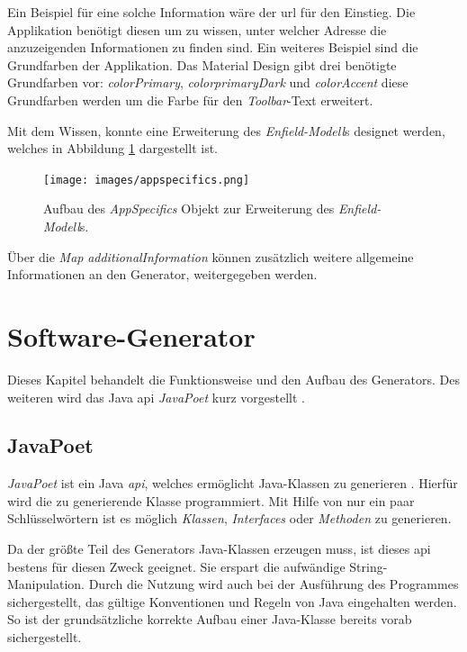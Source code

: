 Ein Beispiel für eine solche Information wäre der \acf{url} für den Einstieg. Die Applikation benötigt diesen um zu wissen, unter welcher Adresse die anzuzeigenden Informationen zu finden sind. Ein weiteres Beispiel sind die Grundfarben der Applikation. Das Material Design gibt drei benötigte Grundfarben vor: \textit{colorPrimary}, \textit{colorprimaryDark} und \textit{colorAccent} diese Grundfarben werden um die Farbe für den \textit{Toolbar}-Text erweitert.

Mit dem Wissen, konnte eine Erweiterung des \textit{Enfield-Modell}s designet werden, welches in Abbildung \ref{fig:appspecifics} dargestellt ist.

\begin{figure}[H]
	\begin{center}
		\texttt{[image: images/appspecifics.png]}
		\caption{Aufbau des \textit{AppSpecifics} Objekt  zur Erweiterung des \textit{Enfield-Modell}s.}
		\label{fig:appspecifics}
	\end{center}
\end{figure}

 Über die \textit{Map} \textit{additionalInformation} können zusätzlich weitere allgemeine Informationen an den Generator, weitergegeben werden.

\section{Software-Generator}

Dieses Kapitel behandelt die Funktionsweise und den Aufbau des Generators. Des weiteren wird das Java \acf{api} \textit{JavaPoet} kurz vorgestellt \cite{poet}.

\subsection{JavaPoet}
\textit{JavaPoet} ist ein Java \textit{\ac{api}}, welches ermöglicht Java-Klassen zu generieren \cite{poet}. Hierfür wird die zu generierende Klasse programmiert. Mit Hilfe von nur ein paar Schlüsselwörtern ist es möglich \textit{Klassen}, \textit{Interfaces} oder \textit{Methoden} zu generieren. 

Da der größte Teil des Generators Java-Klassen erzeugen muss, ist dieses \ac{api} bestens für diesen Zweck geeignet. Sie erspart die aufwändige String-Manipulation. Durch die Nutzung wird auch bei der Ausführung des Programmes sichergestellt, das gültige Konventionen und Regeln von Java eingehalten werden. So ist der grundsätzliche korrekte Aufbau einer Java-Klasse bereits vorab sichergestellt.

